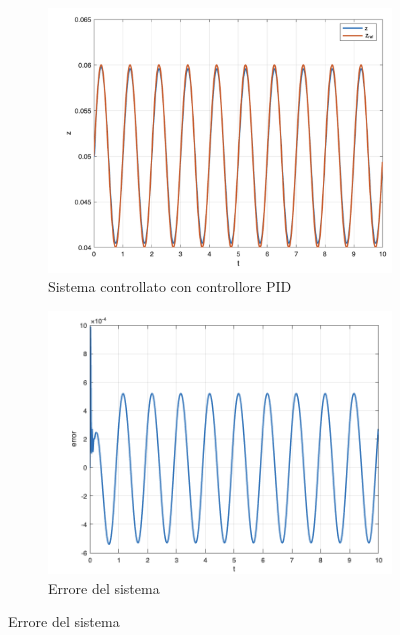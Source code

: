 \documentclass{article}
\begin{document}
\begin{figure}[H]
    \centering
    \begin{minipage}{0.45\textwidth}
        \begin{figure}[H]
            \centering
            \includegraphics[width = 1\textwidth]{Images/sine.png}
            \caption{Sistema controllato con controllore PID}
            \label{fig:PID-sine}
        \end{figure}
    \end{minipage}
    \hfill
    \begin{minipage}{0.45\textwidth}
        \begin{figure}[H]
            \centering
            \includegraphics[width = 1\textwidth]{Images/sine-error.png}
            \caption{Errore del sistema}
            \label{fig:PID-sine-error}
        \end{figure}
    \end{minipage}
\end{figure}
\end{document}
